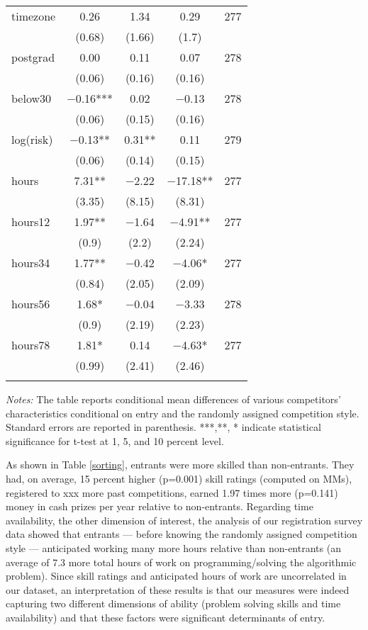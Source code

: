 \documentclass[10pt, titlepage]{article}
\begin{document}
\begin{table}
\begin{tabular}{@{}lcccc}
  timezone &  0.26 &  1.34 &   0.29 & 277 \\ 
   & (0.68) & (1.66) & (1.7) &  \\ 
  postgrad &  0.00 &  0.11 &   0.07 & 278 \\ 
   & (0.06) & (0.16) & (0.16) &  \\ 
  below30 & $-$0.16*** &  0.02 &  $-$0.13 & 278 \\ 
   & (0.06) & (0.15) & (0.16) &  \\ 
  log(risk) & $-$0.13** &  0.31** &   0.11 & 279 \\ 
   & (0.06) & (0.14) & (0.15) &  \\ 
  hours &  7.31** & $-$2.22 & $-$17.18** & 277 \\ 
   & (3.35) & (8.15) & (8.31) &  \\ 
  hours12 &  1.97** & $-$1.64 &  $-$4.91** & 277 \\ 
   & (0.9) & (2.2) & (2.24) &  \\ 
  hours34 &  1.77** & $-$0.42 &  $-$4.06* & 277 \\ 
   & (0.84) & (2.05) & (2.09) &  \\ 
  hours56 &  1.68* & $-$0.04 &  $-$3.33 & 278 \\ 
   & (0.9) & (2.19) & (2.23) &  \\ 
  hours78 &  1.81* &  0.14 &  $-$4.63* & 277 \\ 
   & (0.99) & (2.41) & (2.46) &  \\ 
   \hline\\[-1.8ex]
\end{tabular}
\begin{minipage}{\textwidth}
\footnotesize\emph{Notes:}{ The table reports conditional mean differences of various competitors' characteristics conditional on entry and the randomly assigned competition style. Standard errors are reported in parenthesis. ***,**, * indicate statistical significance for t-test at 1, 5, and 10 percent level.
}\end{minipage}
\end{table}

As shown in Table \ref{sorting}, entrants were more skilled than
non-entrants. They had, on average, 15 percent higher (p=0.001) skill
ratings (computed on MMs), registered to xxx more past competitions,
earned 1.97 times more (p=0.141) money in cash prizes per year relative
to non-entrants. Regarding time availability, the other dimension of
interest, the analysis of our registration survey data showed that
entrants --- before knowing the randomly assigned competition style ---
anticipated working many more hours relative than non-entrants (an
average of 7.3 more total hours of work on programming/solving the
algorithmic problem). Since skill ratings and anticipated hours of work
are uncorrelated in our dataset, an interpretation of these results is
that our measures were indeed capturing two different dimensions of
ability (problem solving skills and time availability) and that these
factors were significant determinants of entry.
\end{document}

